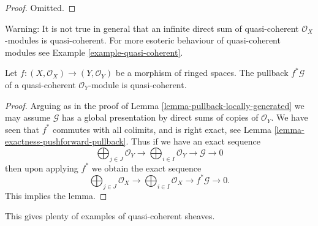 \begin{proof}
Omitted.
\end{proof}

\begin{remark}
\label{remark-infinite-direct-sum-quasi-coherent-not}
Warning: It is not true in general that an infinite
direct sum of quasi-coherent $\mathcal{O}_X$-modules
is quasi-coherent. For more esoteric behaviour of quasi-coherent
modules see Example \ref{example-quasi-coherent}.
\end{remark}

\begin{lemma}
\label{lemma-pullback-quasi-coherent}
Let $f : (X, \mathcal{O}_X) \to (Y, \mathcal{O}_Y)$
be a morphism of ringed spaces.
The pullback $f^*\mathcal{G}$ of a quasi-coherent
$\mathcal{O}_Y$-module is quasi-coherent.
\end{lemma}

\begin{proof}
Arguing as in the proof of Lemma \ref{lemma-pullback-locally-generated}
we may assume $\mathcal{G}$ has a global presentation by
direct sums of copies of $\mathcal{O}_Y$.
We have seen that $f^*$ commutes with all colimits,
and is right exact, see Lemma \ref{lemma-exactness-pushforward-pullback}.
Thus if we have an exact sequence
$$
\bigoplus\nolimits_{j \in J}
\mathcal{O}_Y
\longrightarrow
\bigoplus\nolimits_{i \in I}
\mathcal{O}_Y
\longrightarrow
\mathcal{G}
\longrightarrow
0
$$
then upon applying $f^*$ we obtain the exact sequence
$$
\bigoplus\nolimits_{j \in J}
\mathcal{O}_X
\longrightarrow
\bigoplus\nolimits_{i \in I}
\mathcal{O}_X
\longrightarrow
f^*\mathcal{G}
\longrightarrow
0.
$$
This implies the lemma.
\end{proof}

\noindent
This gives plenty of examples of quasi-coherent sheaves.

